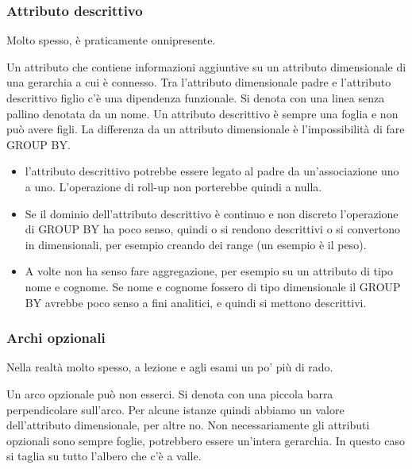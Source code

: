 \subsubsection{Attributo descrittivo}
\begin{info}
	Molto spesso, è praticamente onnipresente.
\end{info}
Un attributo che contiene informazioni aggiuntive su un attributo dimensionale di una gerarchia a cui è connesso.
Tra l'attributo dimensionale padre e l'attributo descrittivo figlio c'è una dipendenza funzionale. Si denota con una linea senza pallino denotata da un nome. Un attributo descrittivo è sempre una foglia e non può avere figli. La differenza da un attributo dimensionale è l'impossibilità di fare GROUP BY.
\begin{info}[Motivazioni:]
	\begin{itemize}
		\item l'attributo descrittivo potrebbe essere legato al padre da un'associazione uno a uno. L'operazione di roll-up non porterebbe quindi a nulla.
		\item Se il dominio dell'attributo descrittivo è continuo e non discreto l'operazione di GROUP BY ha poco senso, quindi o si rendono descrittivi o si convertono in dimensionali, per esempio creando dei range (un esempio è il peso).
		\item A volte non ha senso fare aggregazione, per esempio su un attributo di tipo nome e cognome. Se nome e cognome fossero di tipo dimensionale il GROUP BY avrebbe poco senso a fini analitici, e quindi si mettono descrittivi.
	\end{itemize}
\end{info}

\subsubsection{Archi opzionali}
\begin{info}
	Nella realtà molto spesso, a lezione e agli esami un po' più di rado.
\end{info}
Un arco opzionale può non esserci. Si denota con una piccola barra perpendicolare sull'arco. Per alcune istanze quindi abbiamo un valore dell'attributo dimensionale, per altre no. Non necessariamente gli attributi opzionali sono sempre foglie, potrebbero essere un'intera gerarchia. In questo caso si taglia su tutto l'albero che c'è a valle.

